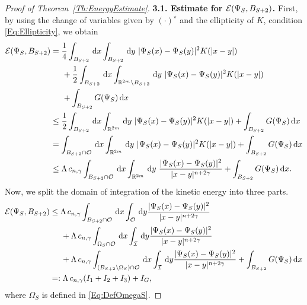 \begin{proof}[Proof of Theorem~\ref{Th:EnergyEstimate}]
\textbf{3.1. Estimate for $\mathcal{E}(\Psi_S,B_{S+2})$.}
First, by using the change of variables given by $(\cdot)^\star$ and the ellipticity of $K$, condition \eqref{Eq:Ellipticity}, we obtain
\begin{align*}
\ecal(\Psi_S,B_{S+2}) &= \frac{1}{4} \int_{B_{S+2}} \d x \int_{B_{S+2}} \d y\ |\Psi_S(x)-\Psi_S(y)|^2K(|x-y|)  \\
&\hspace{5mm} +\frac{1}{2} \int_{B_{S+2}} \d x \int_{\R^{2m} \setminus B_{S+2}} \d y \ |\Psi_S(x)-\Psi_S(y)|^2K(|x-y|) \\
&\hspace{5mm} + \int_{B_{S+2}} G(\Psi_S)  \d x\\
&\leq \frac{1}{2} \int_{B_{S+2}} \d x \int_{\R^{2m}} \d y\ |\Psi_S(x)-\Psi_S(y)|^2K(|x-y|) + \int_{B_{S+2}} G(\Psi_S) \d x \\
&= \int_{B_{S+2} \cap \ocal} \d x \int_{\R^{2m}} \d y\ |\Psi_S(x)-\Psi_S(y)|^2K(|x-y|)  + \int_{B_{S+2}} G(\Psi_S) \d x \\
&\leq \Lambda\, c_{n,\s} \int_{B_{S+2} \cap \ocal} \d x \int_{\R^{2m}} \d y \ \frac{|\Psi_S(x)-\Psi_S(y)|^2}{|x-y|^{n+2\s}} + \int_{B_{S+2}} G(\Psi_S) \d x.
\end{align*}
Now, we split the domain of integration of the kinetic energy into three parts.
\begin{align*}
\mathcal{E}(\Psi_S,B_{S+2}) &\leq \Lambda\, c_{n,\gamma} \int_{B_{S+2} \cap \mathcal{O}} \,\mathrm{d} x \int_{\mathcal{O}} \,\mathrm{d} y \frac{|\Psi_S(x)-\Psi_S(y)|^2}{|x-y|^{n+2\gamma}} \\
&\hspace{5mm} + \Lambda\, c_{n,\gamma} \int_{\Omega_S \cap \mathcal{O}} \,\mathrm{d} x \int_{\mathcal{I}} \,\mathrm{d} y \frac{|\Psi_S(x)-\Psi_S(y)|^2}{|x-y|^{n+2\gamma}} \\
&\hspace{5mm} + \Lambda\, c_{n,\gamma} \int_{(B_{S+2}\setminus \Omega_S) \cap \mathcal{O}} \,\mathrm{d} x \int_{\mathcal{I}} \,\mathrm{d} y \frac{|\Psi_S(x)-\Psi_S(y)|^2}{|x-y|^{n+2\gamma}} + \int_{B_{S+2}} G(\Psi_S) \,\mathrm{d} x\\
&=:\Lambda\, c_{n,\gamma} (I_1+I_2+I_3)+I_G,
\end{align*}
where $\Omega_S$ is defined in \eqref{Eq:DefOmegaS}. 


\end{proof}
